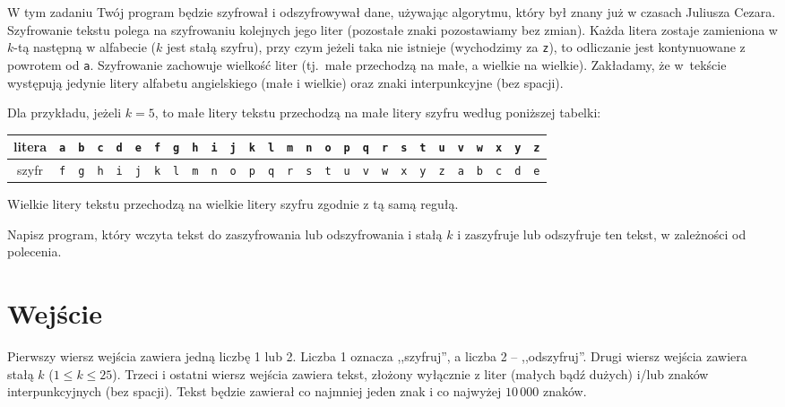 \documentclass{spiral-kurs}
\begin{document}
\makeheader
%
  W tym zadaniu Twój program będzie szyfrował i odszyfrowywał dane, używając algorytmu,
  który był znany już w czasach Juliusza Cezara.
  Szyfrowanie tekstu polega na szyfrowaniu kolejnych jego liter (pozostałe znaki pozostawiamy bez zmian).
  Każda litera zostaje zamieniona w $k$-tą następną w alfabecie
  ($k$ jest stałą szyfru), przy czym jeżeli taka nie istnieje (wychodzimy za \texttt{z}), to
  odliczanie jest kontynuowane z powrotem od \texttt{a}.
  Szyfrowanie zachowuje wielkość liter (tj.\ małe przechodzą na małe, a wielkie na wielkie).
  Zakładamy, że w~tekście występują jedynie litery alfabetu angielskiego (małe i wielkie)
  oraz znaki interpunkcyjne (bez spacji).

  Dla przykładu, jeżeli $k=5$, to małe litery tekstu przechodzą na małe litery szyfru według poniższej tabelki:

  \medskip
  \noindent
  {\small
    \begin{center}
  \begin{tabular}{|c|c|c|c|c|c|c|c|c|c|c|c|c|c|c|c|c|c|c|c|c|c|c|c|c|c|c|}
    \hline
    litera &
    \texttt{a} & \texttt{b} & \texttt{c} & \texttt{d} & \texttt{e} & \texttt{f} & \texttt{g} & \texttt{h} & \texttt{i} & \texttt{j} & \texttt{k} & \texttt{l} & \texttt{m} & \texttt{n} & \texttt{o} & \texttt{p} & \texttt{q} & \texttt{r} & \texttt{s} & \texttt{t} & \texttt{u} & \texttt{v} & \texttt{w} & \texttt{x} & \texttt{y} & \texttt{z} \\\hline
    szyfr &
    \texttt{f} & \texttt{g} & \texttt{h} & \texttt{i} & \texttt{j} & \texttt{k} & \texttt{l} & \texttt{m} & \texttt{n} & \texttt{o} & \texttt{p} & \texttt{q} & \texttt{r} & \texttt{s} & \texttt{t} & \texttt{u} & \texttt{v} & \texttt{w} & \texttt{x} & \texttt{y} & \texttt{z} & \texttt{a} & \texttt{b} & \texttt{c} & \texttt{d} & \texttt{e} \\\hline
  \end{tabular}
\end{center}
}

  \medskip
  \noindent
  Wielkie litery tekstu przechodzą na wielkie litery szyfru zgodnie z tą samą regułą.

  Napisz program, który wczyta tekst do zaszyfrowania lub odszyfrowania i stałą $k$
  i zaszyfruje lub odszyfruje ten tekst, w zależności od polecenia.

  \section{Wejście}
  Pierwszy wiersz wejścia zawiera jedną liczbę 1 lub 2.
  Liczba 1 oznacza ,,szyfruj'', a liczba 2 -- ,,odszyfruj''.
  Drugi wiersz wejścia zawiera stałą $k$ ($1\le k\le 25$).
  Trzeci i ostatni wiersz wejścia zawiera tekst, złożony wyłącznie z liter (małych bądź dużych) i/lub znaków interpunkcyjnych (bez spacji).
  Tekst będzie zawierał co najmniej jeden znak i co najwyżej $10\,000$ znaków.
\end{document}
